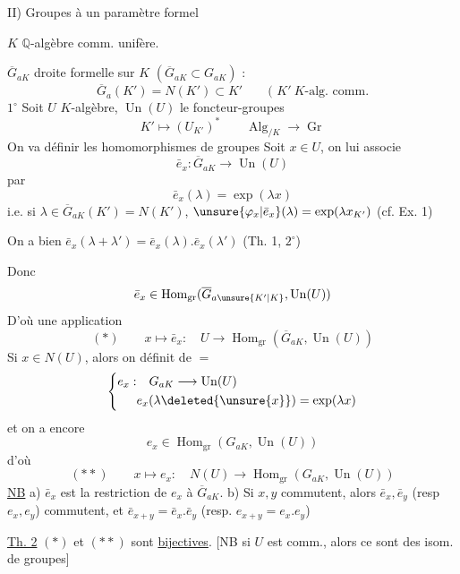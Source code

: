 II) Groupes à un paramètre formel

$K$ $\mathbb{Q}$-algèbre comm. unifère.

$\overline G_{aK}$ droite formelle sur $K$ $(\overline G_{aK}\subset G_{aK})$ :
\[
\overline G_a(K')=N(K')\subset K'\qquad\text{( }K'\ K\text{-alg. comm.}
\]
$1^\circ$ Soit $U$ $K$-algèbre, $\operatorname{Un}(U)$ le foncteur-groupes
\[
K'\longmapsto(U_{K'})^*\qquad\operatorname{Alg}_{/K}\longrightarrow\operatorname{Gr}
\]
On va définir les homomorphismes de groupes
Soit $x\in U$, on lui associe
\[
\bar e_x:\overline G_{aK}\longrightarrow\operatorname{Un}(U)
\]
par
\[
\bar e_x(\lambda)=\exp(\lambda x)
\]
i.e. si $\lambda\in\overline G_{aK}(K')=N(K')$, $\unsure{\varphi_x|\bar e_x}(\lambda)=\exp(\lambda x_{K'})$ (cf. Ex. 1)

On a bien $\bar e_x(\lambda+\lambda')=\bar e_x(\lambda).\bar e_x(\lambda')$ (Th. 1, $2^\circ$)

Donc
\[
\bar e_x\in\operatorname{Hom}_{\mathrm{gr}}(\overline G_{a\unsure{K'|K}},\operatorname{Un}(U))
\]
D'où une application
\[
(*)\qquad x\longmapsto\bar e_x:\quad U\longrightarrow\operatorname{Hom}_{\mathrm{gr}}(\overline G_{aK},\operatorname{Un}(U))
\]
Si $x\in N(U)$, alors on définit de $=$
\[
\left\{\begin{aligned}
e_x:&\quad G_{aK}\longrightarrow\operatorname{Un}(U)\\
&e_x(\lambda\deleted{\unsure{x}})=\exp(\lambda x)
\end{aligned}\right.
\]
et on a encore
\[
e_x\in\operatorname{Hom}_{\mathrm{gr}}(G_{aK},\operatorname{Un}(U))
\]
d'où
\[
(**)\qquad x\longmapsto e_x:\quad N(U)\longrightarrow\operatorname{Hom}_{\mathrm{gr}}(G_{aK},\operatorname{Un}(U))
\]
\uline{NB} a) $\bar e_x$ est la restriction de $e_x$ à $\overline G_{aK}$. b) Si $x,y$ commutent, alors $\bar e_x,\bar e_y$ (resp $e_x,e_y$) commutent, et $\bar e_{x+y}=\bar e_x.\bar e_y$ (resp. $e_{x+y}=e_x.e_y$)

\uline{Th. 2} $(*)$ et $(**)$ sont \uline{bijectives}. [NB si $U$ est comm., alors ce sont des isom. de groupes]
